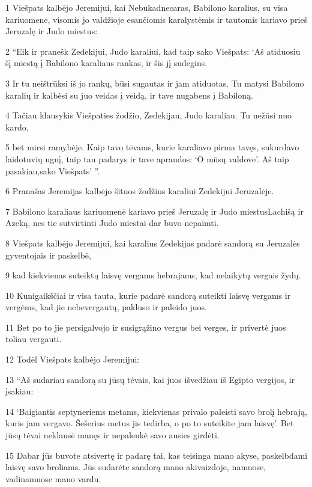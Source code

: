 \par 1 Viešpats kalbėjo Jeremijui, kai Nebukadnecaras, Babilono karalius, su visa kariuomene, visomis jo valdžioje esančiomis karalystėmis ir tautomis kariavo prieš Jeruzalę ir Judo miestus: 
\par 2 “Eik ir pranešk Zedekijui, Judo karaliui, kad taip sako Viešpats: ‘Aš atiduosiu šį miestą į Babilono karaliaus rankas, ir šis jį sudegins. 
\par 3 Ir tu neištrūksi iš jo rankų, būsi sugautas ir jam atiduotas. Tu matysi Babilono karalių ir kalbėsi su juo veidas į veidą, ir tave nugabens į Babiloną. 
\par 4 Tačiau klausykis Viešpaties žodžio, Zedekijau, Judo karaliau. Tu nežūsi nuo kardo, 
\par 5 bet mirsi ramybėje. Kaip tavo tėvams, kurie karaliavo pirma tavęs, sukurdavo laidotuvių ugnį, taip tau padarys ir tave apraudos: ‘O mūsų valdove’. Aš taip pasakiau,­sako Viešpats’ ”. 
\par 6 Pranašas Jeremijas kalbėjo šituos žodžius karaliui Zedekijui Jeruzalėje. 
\par 7 Babilono karaliaus kariuomenė kariavo prieš Jeruzalę ir Judo miestus­Lachišą ir Azeką, nes tie sutvirtinti Judo miestai dar buvo nepaimti. 
\par 8 Viešpats kalbėjo Jeremijui, kai karalius Zedekijas padarė sandorą su Jeruzalės gyventojais ir paskelbė, 
\par 9 kad kiekvienas suteiktų laisvę vergams hebrajams, kad nelaikytų vergais žydų. 
\par 10 Kunigaikščiai ir visa tauta, kurie padarė sandorą suteikti laisvę vergams ir vergėms, kad jie nebevergautų, pakluso ir paleido juos. 
\par 11 Bet po to jie persigalvojo ir susigrąžino vergus bei verges, ir privertė juos toliau vergauti. 
\par 12 Todėl Viešpats kalbėjo Jeremijui: 
\par 13 “Aš sudariau sandorą su jūsų tėvais, kai juos išvedžiau iš Egipto vergijos, ir įsakiau: 
\par 14 ‘Baigiantis septyneriems metams, kiekvienas privalo paleisti savo brolį hebrają, kuris jam vergavo. Šešerius metus jis tedirba, o po to suteikite jam laisvę’. Bet jūsų tėvai neklausė manęs ir nepalenkė savo ausies girdėti. 
\par 15 Dabar jūs buvote atsivertę ir padarę tai, kas teisinga mano akyse, paskelbdami laisvę savo broliams. Jūs sudarėte sandorą mano akivaizdoje, namuose, vadinamuose mano vardu. 
